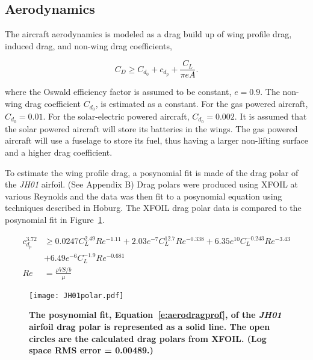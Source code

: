 \documentclass[]{aiaa-tc}%
\begin{document}
\subsection{Aerodynamics}

The aircraft aerodynamics is modeled as a drag build up of wing profile drag, induced drag, and non-wing drag coefficients, 

\begin{equation}
    \label{e:aerodragb}
    C_D \geq C_{d_0} + c_{d_p} + \frac{C_L}{\pi e A}.
    \end{equation}

where the Oswald efficiency factor is assumed to be constant, $e=0.9$. 
The non-wing drag coefficient $C_{d_0}$, is estimated as a constant.  
For the gas powered aircraft, $C_{d_0} = 0.01$.  
For the solar-electric powered aircraft, $C_{d_0} = 0.002$.  
It is assumed that the solar powered aircraft will store its batteries in the wings. 
The gas powered aircraft will use a fuselage to store its fuel, thus having a larger non-lifting surface and a higher drag coefficient.\cite{raymer}
    
    To estimate the wing profile drag, a posynomial fit is made of the drag polar of the \emph{JH01} airfoil. (See Appendix B) 
    Drag polars were produced using XFOIL at various Reynolds and the data was then fit to a posynomial equation using techniques described in Hoburg.\cite{fitting}
    The XFOIL drag polar data is compared to the posynomial fit in Figure~\ref{f:JH01polar}.

    \begin{align}
        \label{e:aerodragprof}
        c_{d_p}^{3.72} &\geq 0.0247C_L^{2.49}Re^{-1.11} + 2.03e^{-7}C_L^{12.7}Re^{-0.338} + 6.35e^{10}C_L^{-0.243}Re^{-3.43} \nonumber \\
                       &+ 6.49e^{-6}C_L^{-1.9}Re^{-0.681} \\
        Re &= \frac{\rho V S/b}{\mu}
    \end{align}

\begin{figure}[H]
	\begin{center}
	\texttt{[image: JH01polar.pdf]}
    \caption{ \textbf{ The posynomial fit, Equation~\eqref{e:aerodragprof}, of the \emph{JH01} airfoil drag polar is represented as a solid line.  The open circles are the calculated drag polars from XFOIL. (Log space RMS error = 0.00489.)} }
	\label{f:JH01polar}
	\end{center}
\end{figure}
\end{document}
